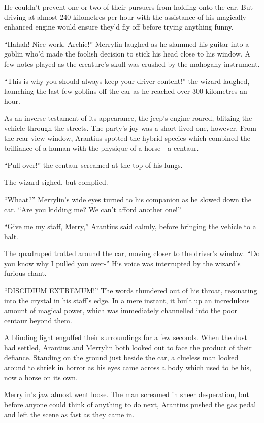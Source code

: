 He couldn’t prevent one or two of their pursuers from holding onto the car. But driving at almost 240 kilometres per hour with the assistance of his magically-enhanced engine would ensure they’d fly off before trying anything funny.

“Hahah! Nice work, Archie!” Merrylin laughed as he slammed his guitar into a goblin who’d made the foolish decision to stick his head close to his window. A few notes played as the creature’s skull was crushed by the mahogany instrument.

“This is why you should always keep your driver content!” the wizard laughed, launching the last few goblins off the car as he reached over 300 kilometres an hour.

As an inverse testament of its appearance, the jeep’s engine roared, blitzing the vehicle through the streets. The party’s joy was a short-lived one, however. From the rear view window, Arantius spotted the hybrid species which combined the brilliance of a human with the physique of a horse - a centaur.

“Pull over!” the centaur screamed at the top of his lungs.

The wizard sighed, but complied.

“Whaat?” Merrylin’s wide eyes turned to his companion as he slowed down the car. “Are you kidding me? We can’t afford another one!”

“Give me my staff, Merry,” Arantius said calmly, before bringing the vehicle to a halt.

The quadruped trotted around the car, moving closer to the driver’s window. “Do you know why I pulled you over-” His voice was interrupted by the wizard’s furious chant.

“DISCIDIUM EXTREMUM!” The words thundered out of his throat, resonating into the crystal in his staff’s edge. In a mere instant, it built up an incredulous amount of magical power, which was immediately channelled into the poor centaur beyond them.

A blinding light engulfed their surroundings for a few seconds. When the dust had settled, Arantius and Merrylin both looked out to face the product of their defiance. Standing on the ground just beside the car, a clueless man looked around to shriek in horror as his eyes came across a body which used to be his, now a horse on its own.

Merrylin’s jaw almost went loose. The man screamed in sheer desperation, but before anyone could think of anything to do next, Arantius pushed the gas pedal and left the scene as fast as they came in.

